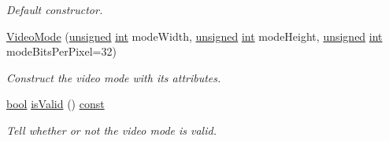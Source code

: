 \begin{DoxyCompactItemize}
\begin{DoxyCompactList}\small\item\em Default constructor. \end{DoxyCompactList}\item 
\hyperlink{classsf_1_1_video_mode_a46c35ed41de9e115661dcd529d64e9d3}{Video\-Mode} (\hyperlink{curses_8priv_8h_aca40206900cfc164654362fa8d4ad1e6}{unsigned} \hyperlink{term__entry_8h_ad65b480f8c8270356b45a9890f6499ae}{int} mode\-Width, \hyperlink{curses_8priv_8h_aca40206900cfc164654362fa8d4ad1e6}{unsigned} \hyperlink{term__entry_8h_ad65b480f8c8270356b45a9890f6499ae}{int} mode\-Height, \hyperlink{curses_8priv_8h_aca40206900cfc164654362fa8d4ad1e6}{unsigned} \hyperlink{term__entry_8h_ad65b480f8c8270356b45a9890f6499ae}{int} mode\-Bits\-Per\-Pixel=32)
\begin{DoxyCompactList}\small\item\em Construct the video mode with its attributes. \end{DoxyCompactList}\item 
\hyperlink{term__entry_8h_a002004ba5d663f149f6c38064926abac}{bool} \hyperlink{classsf_1_1_video_mode_aa64ff5420dde3b31c24b9c4e2be9cd9c}{is\-Valid} () \hyperlink{term__entry_8h_a57bd63ce7f9a353488880e3de6692d5a}{const} 
\begin{DoxyCompactList}\small\item\em Tell whether or not the video mode is valid. \end{DoxyCompactList}\end{DoxyCompactItemize}
